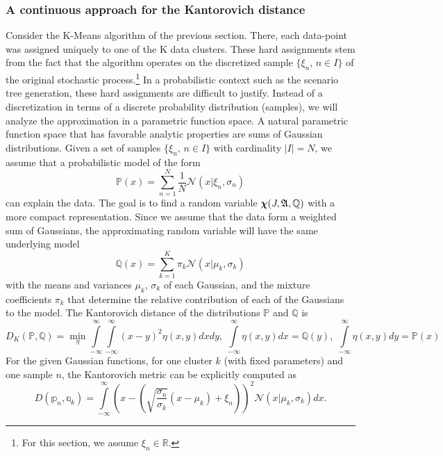 \subsubsection{A continuous approach for the Kantorovich distance}
\label{sec:cont-appr-kant}
Consider the K-Means algorithm of the previous section.
There, each data-point was assigned uniquely to one of the K data clusters.
These hard assignments stem from the fact that the algorithm operates on the discretized sample $\{\xi_n,\, n\in I\}$ of the original stochastic process.\footnote{For this section, we assume $\xi_n\in\mathbb{R}$.}
In a probabilistic context such as the scenario tree generation, these hard assignments are difficult to justify.
Instead of a discretization in terms of a discrete probability distribution (samples), we will analyze the approximation in a parametric function space.
A natural parametric function space that has favorable analytic properties are sums of Gaussian distributions.
Given a set of samples $\{\xi_n,\, n\in I\}$ with cardinality $|I|=N$, we assume that a probabilistic model of the form
\begin{equation}
  \label{eq:31}
  \mathbb{P}(x) = \sum_{n=1}^N\frac{1}{N}\mathcal{N}(x|\xi_n,\sigma_n)
\end{equation}
can explain the data.
The goal is to find a random variable $\boldsymbol\chi(J,\mathfrak{A},\mathbb{Q})$ with a more compact representation.
Since we assume that the data form a weighted sum of Gaussians, the approximating random variable will have the same underlying model
\begin{equation}
  \label{eq:32}
  \mathbb{Q}(x) = \sum_{k=1}^K\pi_k\mathcal{N}(x|\mu_k, \sigma_k)
\end{equation}
with the means and variances $\mu_k$, $\sigma_k$ of each Gaussian, and the mixture coefficients $\pi_k$ that determine the relative contribution of each of the Gaussians to the model.
The Kantorovich distance of the distributions $\mathbb{P}$ and $\mathbb{Q}$ is
\begin{equation}
  \label{eq:33}
  D_K(\mathbb{P,Q}) = \min\limits_{\eta}\int\limits_{-\infty}^{\infty}\int\limits_{-\infty}^{\infty}(x-y)^2\eta(x,y)dxdy,\; \int\limits_{-\infty}^{\infty}\eta(x,y)dx = \mathbb{Q}(y),\;\int\limits_{-\infty}^{\infty}\eta(x,y)dy = \mathbb{P}(x)
\end{equation}
For the given Gaussian functions, for one cluster $k$ (with fixed parameters) and one sample $n$, the Kantorovich metric can be explicitly computed as
\begin{equation}
  \label{eq:34}
  D(\mathbb{p}_n,\mathbb{q}_k) = \int\limits_{-\infty}^{\infty}\left(x-\left(\sqrt{\frac{\sigma_n}{\sigma_k}}(x-\mu_k)+\xi_n\right)\right)^2\mathcal{N}(x|\mu_k,\sigma_k)dx.
\end{equation}
